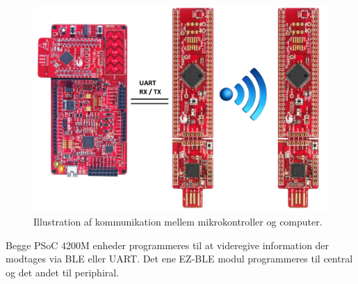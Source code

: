 \begin{figure}[H]
	\centering
	\includegraphics[width=1\textwidth]{figures/Traadloes_Komm_Imp}
	\caption{Illustration af kommunikation mellem mikrokontroller og computer.} 
	\label{fig:Traadloes_Komm_Imp}
\end{figure}

Begge PSoC 4200M enheder programmeres til at videregive information der modtages via BLE eller UART. Det ene EZ-BLE modul programmeres til central og det andet til periphiral.    